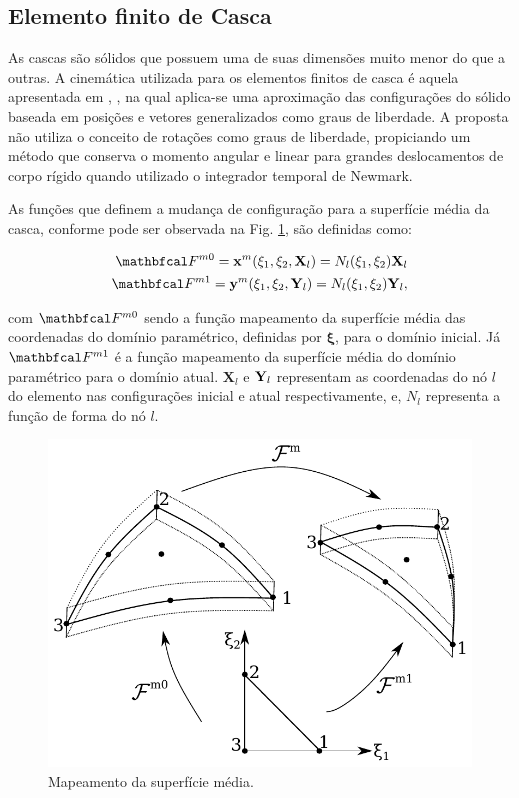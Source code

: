 \documentclass[tese_patricia]{subfiles}
\begin{document}
\subsection{Elemento finito de Casca}

As cascas são sólidos que possuem uma de suas dimensões muito menor do que a outras. A cinemática utilizada para os elementos finitos de casca é aquela apresentada em , , na qual aplica-se uma aproximação das configurações do sólido baseada em posições e vetores generalizados como graus de liberdade. A proposta não utiliza o conceito de rotações como graus de liberdade, propiciando um método que conserva o momento angular e linear para grandes deslocamentos de corpo rígido quando utilizado o integrador temporal de Newmark.

As funções que definem a mudança de configuração para a superfície média da casca, conforme pode ser observada na Fig. \ref{fig:casca1}, são definidas como:

\begin{align}
\deformation^{m0} = \lPosition^{m}(\xi_{1},\xi_{2},\mathbf{X}_{l}) = N_{l} (\xi_{1},\xi_{2}) \mathbf{X}_{l}\label{eq:Lposition}\\
\deformation^{m1} = \ePosition^{m}(\xi_{1},\xi_{2},\SolidPos_{l}) = N_{l} (\xi_{1},\xi_{2}) \SolidPos_{l}, \label{eq:Eposition}
\end{align}

\noindent com $\deformation^{m0}$ sendo a função mapeamento da superfície média das coordenadas do domínio paramétrico, definidas por $\bm{\xi}$, para o domínio inicial. Já $\deformation^{m1}$ é a função mapeamento da superfície média do domínio paramétrico para o domínio atual. $\mathbf{X}_{l}$ e $\mathbf{Y}_{l}$ representam as coordenadas do nó $l$ do elemento nas configurações inicial e atual respectivamente, e,  $N_{l}$ representa a função de forma do nó $l$.

\begin{figure}[htb!]
	\centering
	\includegraphics[scale=0.8,trim=0cm 0.0cm 0cm 0cm, clip=true]{Imagens/Cap4/midSurf.pdf}	
	\caption{Mapeamento da superfície média.}
	\label{fig:casca1}
\end{figure}
\end{document}
